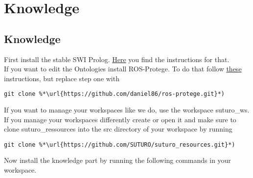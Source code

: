 \documentclass[main.tex]{subfiles}
\begin{document}
\section{Knowledge}
\subsection{Knowledge}
First install the stable SWI Prolog. \href{https://www.swi-prolog.org/build/PPA.html}{Here} you find the instructions for that.\\
If you want to edit the Ontologies install ROS-Protege. To do that follow \href{https://github.com/protegeproject/protege/wiki/Building-from-Source}{these} instructions, but replace step one with\\
\begin{lstlisting}
git clone %*\url{https://github.com/daniel86/ros-protege.git}*)
\end{lstlisting}

If you want to manage your workspaces like we do, use the workspace suturo\_ws.\\
If you manage your workspaces differently create or open it and make sure to clone suturo\_ressources into the src directory of your workspace by running\\
\begin{lstlisting}
git clone %*\url{https://github.com/SUTURO/suturo_resources.git}*) 
\end{lstlisting}
Now install the knowledge part by running the following commands in your workspace.\\
\begin{mdframed}[backgroundcolor=mygray, rightline=false]

\end{mdframed}
\end{document}
